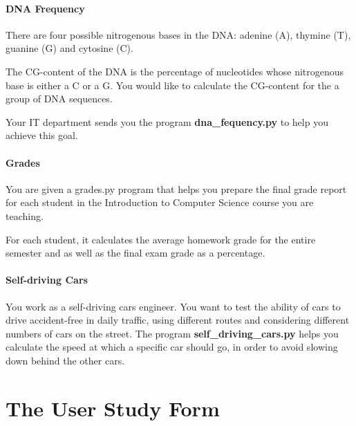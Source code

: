 \documentclass[10pt]{report}
\begin{document}
\paragraph{DNA Frequency}

There are four possible nitrogenous bases in the DNA: adenine (A), thymine (T), guanine (G) and cytosine (C).

The CG-content of the DNA is the percentage of nucleotides whose nitrogenous base is
either a C or a G. You would like to calculate the CG-content for the a group of DNA
sequences. 

Your IT department sends you the program \textbf{dna_fequency.py} to help you achieve this goal.

\paragraph{Grades}
You are given a  grades.py program that helps you prepare the final grade report for each student in the Introduction to Computer Science course you are teaching.

For each student, it calculates the average homework grade for the entire semester and as well as the final exam grade as a percentage.


\paragraph{Self-driving Cars}

You work as a self-driving cars engineer. You want to test the ability of cars to drive
accident-free in daily traffic, using different routes and considering different numbers of cars on the street.
The program \textbf{self_driving_cars.py} helps you calculate the speed at which a specific car should go, in order to avoid slowing down behind the other cars.

\section{The User Study Form}


\printbibliography
\end{document}

